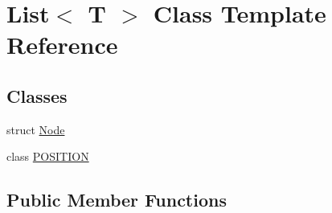 \hypertarget{class_list}{}\section{List$<$ T $>$ Class Template Reference}
\label{class_list}
\subsection*{Classes}
\begin{DoxyCompactItemize}
\item 
struct \hyperlink{struct_list_1_1_node}{Node}
\item 
class \hyperlink{class_list_1_1_p_o_s_i_t_i_o_n}{P\+O\+S\+I\+T\+I\+ON}
\end{DoxyCompactItemize}
\subsection*{Public Member Functions}

